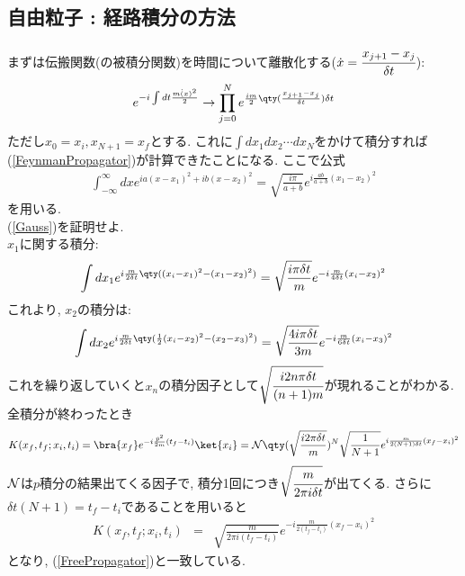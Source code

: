 \documentclass[10.5pt,a4paper]{jreport}
\begin{document}
\subsection{自由粒子 : 経路積分の方法}
まずは伝搬関数(の被積分関数)を時間について離散化する($\dot{x} = \cfrac{x_{j+1} - x_j}{\delta t}$):
\begin{eqnarray}
  e^{-i\int dt\frac{m\dot(x)^2}{2}} \rightarrow \prod_{j=0}^Ne^{\frac{im}{2}\qty(\frac{x_{j+1} - x_j}{\delta t})\delta t}
\end{eqnarray}
ただし$x_0 = x_i, x_{N+1} = x_f$とする. これに$\int dx_1dx_2\cdots dx_N$をかけて積分すれば(\ref{FeynmanPropagator})が計算できたことになる. ここで公式
\begin{eqnarray}
  \int_{-\infty}^{\infty} dx e^{ia(x-x_1)^2 + ib(x-x_2)^2} = \sqrt{\frac{i\pi}{a+b}}e^{i\frac{ab}{a+b}(x_1-x_2)^2}\label{Gauss}
\end{eqnarray}
を用いる. \\

 (\ref{Gauss})を証明せよ.\\

$x_1$に関する積分:
\begin{eqnarray}
  \int dx_1 e^{i\frac{m}{2\delta t}\qty((x_i - x_1)^2-(x_1 - x_2)^2)} = \sqrt{\frac{i\pi\delta t}{m}}e^{-i\frac{m}{4\delta t}(x_i - x_2)^2}
\end{eqnarray}
これより, $x_2$の積分は:
\begin{eqnarray}
  \int dx_2 e^{i\frac{m}{2\delta t}\qty(\frac{1}{2}(x_i - x_2)^2-(x_2 - x_3)^2)} = \sqrt{\frac{4i\pi\delta t}{3m}}e^{-i\frac{m}{6\delta t}(x_i - x_3)^2}
\end{eqnarray}
これを繰り返していくと$x_n$の積分因子として$\sqrt{\cfrac{i2n\pi\delta t}{(n+1)m}}$が現れることがわかる. 全積分が終わったとき
\begin{eqnarray}
  K(x_f, t_f;x_i, t_i) = \bra{x_f}e^{-i\frac{\hat{p}^2}{2m}(t_f - t_i)}\ket{x_i} = {\cal N}\qty(\sqrt{\frac{i2\pi\delta t}{m}})^N\sqrt{\frac{1}{N+1}}e^{i\frac{m}{2(N+1)\delta t}(x_f - x_i)^2}\label{Kernel}
\end{eqnarray}
${\cal N}$は$p$積分の結果出てくる因子で, 積分1回につき$\sqrt{\cfrac{m}{2\pi i\delta t}}$が出てくる. さらに$\delta t(N+1) = t_f - t_i$であることを用いると
\begin{eqnarray}
  K(x_f, t_f;x_i, t_i ) &=&\sqrt{\frac{m}{2\pi i(t_f-t_i)}}e^{-i\frac{m}{2(t_f - t_i)}(x_f - x_i)^2}
\end{eqnarray}
となり, (\ref{FreePropagator})と一致している.\\
\end{document}
